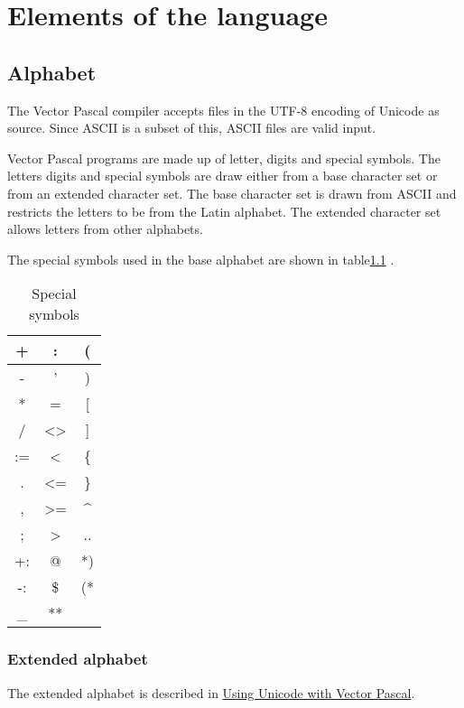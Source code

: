\chapter{Elements of the language}


\section{Alphabet}
The Vector Pascal compiler accepts files in the UTF-8 encoding of
 Unicode as source. Since ASCII is a subset of this, ASCII files are valid input.

Vector Pascal programs are made up of letter, digits and special 
symbols. The letters digits and special symbols are draw either from a base
 character set or from an extended character set. The base character set is drawn 
from ASCII and restricts the letters to be from the Latin alphabet. 
The extended character set allows letters from other alphabets. 
 



 The special symbols used in the base alphabet are shown in table\ref{specials} .
\begin{table}

\caption{Special symbols\label{specials}}
\vspace{0.3cm}
{\centering \begin{tabular}{|c|c|c|}
\hline 
+&
:&
(\\
\hline 
-&
'&
)\\
\hline 
{*}&
=&
{[}\\
\hline 
/&
<>&
{]}\\
\hline 
:=&
<&
\{\\
\hline 
.&
<=&
\}\\
\hline 
,&
>=&
\textasciicircum{}\\
\hline 
;&
>&
..\\
\hline 
+:&
@&
{*})\\
\hline 
-:&
\$&
({*}\\
\hline 
\_&
{*}{*}&
\\
\hline 
\end{tabular}\par}\vspace{0.3cm}
\end{table}
\subsection{Extended alphabet}
The extended alphabet is described in \href{VPUnicode.htm}{Using Unicode with Vector Pascal}.


